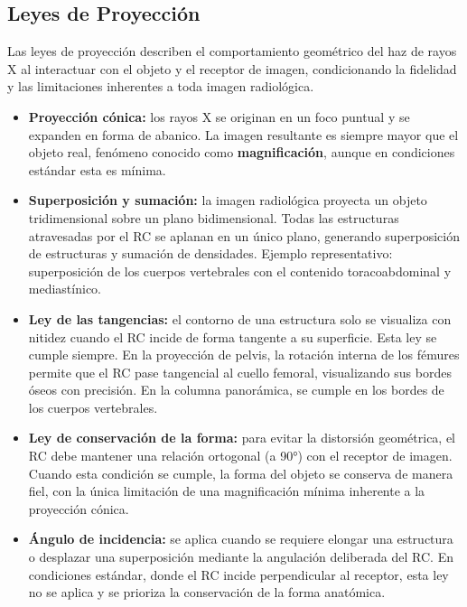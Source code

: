 	\subsection{Leyes de Proyección}
	
	Las leyes de proyección describen el comportamiento geométrico del haz de rayos X al interactuar con el objeto y el receptor de imagen, condicionando la fidelidad y las limitaciones inherentes a toda imagen radiológica.
	
	\begin{itemize}
		\item \textbf{Proyección cónica:} los rayos X se originan en un foco puntual y se expanden en forma de abanico. La imagen resultante es siempre mayor que el objeto real, fenómeno conocido como \textbf{magnificación}, aunque en condiciones estándar esta es mínima.
		
		\item \textbf{Superposición y sumación:} la imagen radiológica proyecta un objeto tridimensional sobre un plano bidimensional. Todas las estructuras atravesadas por el RC se aplanan en un único plano, generando superposición de estructuras y sumación de densidades. Ejemplo representativo: superposición de los cuerpos vertebrales con el contenido toracoabdominal y mediastínico.
		
		\item \textbf{Ley de las tangencias:} el contorno de una estructura solo se visualiza con nitidez cuando el RC incide de forma tangente a su superficie. Esta ley se cumple siempre. En la proyección de pelvis, la rotación interna de los fémures permite que el RC pase tangencial al cuello femoral, visualizando sus bordes óseos con precisión. En la columna panorámica, se cumple en los bordes de los cuerpos vertebrales.
		
		\item \textbf{Ley de conservación de la forma:} para evitar la distorsión geométrica, el RC debe mantener una relación ortogonal (a 90°) con el receptor de imagen. Cuando esta condición se cumple, la forma del objeto se conserva de manera fiel, con la única limitación de una magnificación mínima inherente a la proyección cónica.
		
		\item \textbf{Ángulo de incidencia:} se aplica cuando se requiere elongar una estructura o desplazar una superposición mediante la angulación deliberada del RC. En condiciones estándar, donde el RC incide perpendicular al receptor, esta ley no se aplica y se prioriza la conservación de la forma anatómica.
	\end{itemize}
	
